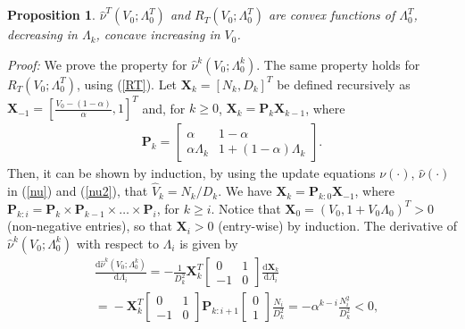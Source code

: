 \documentclass[10pt,twocolumn,twoside]{IEEEtran}
\newtheorem{propos}{Proposition}
\theoremstyle{plain}
\begin{document}
  \section{}
  \label{appprop}
\begin{propos}\label{propV}
$\hat\nu^T(V_0;\Lambda_0^{T})$ and $R_T(V_0;\Lambda_0^T)$ are convex functions of $\Lambda_0^T$, decreasing in $\Lambda_k$,
 concave increasing in $V_0$.
\end{propos}
\noindent\emph{Proof:}
We prove the property for $\hat\nu^k(V_0;\Lambda_0^{k})$. 
The same property holds for
$R_T(V_0;\Lambda_0^T)$, using (\ref{RT}).
Let $\mathbf X_k=[N_k, D_k]^T$ be defined recursively as 
$\mathbf X_{-1}=\left[\frac{V_0-(1-\alpha)}{\alpha}, 1\right]^T$ and, for $k\geq 0$,
$\mathbf X_{k}=\mathbf P_k\mathbf X_{k-1}$, where
\begin{align}
\mathbf P_k=\left[
\begin{array}{cc}
\alpha & 1-\alpha
\\
\alpha\Lambda_k&1+(1-\alpha)\Lambda_k
\end{array}\right].
\end{align}
Then, it can be shown by induction, by using the update equations $\nu(\cdot)$, $\hat \nu(\cdot)$ in (\ref{nu}) and (\ref{nu2}),
that $\hat V_k=N_k/ D_k$.
We have $\mathbf X_{k}=\mathbf P_{k:0}\mathbf X_{-1}$,
where $\mathbf P_{k:i}=\mathbf P_k\times\mathbf P_{k-1}\times\dots\times \mathbf P_i$, for $k\geq i$.
Notice that $\mathbf X_0{=}(V_0,1{+}V_0\Lambda_0)^T{>}0$ (non-negative entries),
so that $\mathbf X_i{>}0$ (entry-wise) by induction.
The derivative of $\hat\nu^k(V_0;\Lambda_0^{k})$ with respect to $\Lambda_i$ is given by
\begin{align}
\label{derivSi}
&\frac{\mathrm d\hat\nu^k(V_0;\Lambda_0^{k})}{\mathrm d \Lambda_i}
=-\frac{1}{ D_k^2}
\mathbf X_{k}^T
\left[
\begin{array}{cc}
0 & 1
\\
-1&0
\end{array}\right]
\frac{\mathrm d\mathbf X_{k}}{\mathrm d\Lambda_i}
\\&\nonumber
=
\!-
\mathbf X_{k}^T
\left[
\begin{array}{cc}
0 & 1
\\
-1&0
\end{array}\right]
\mathbf P_{k:i+1}
\left[\begin{array}{c}0\\1\end{array}\right]
\frac{N_{i}}{ D_k^2}
=-\alpha^{k-i}\frac{N_i^2}{ D_k^2}<0,
\end{align}
\end{document}
